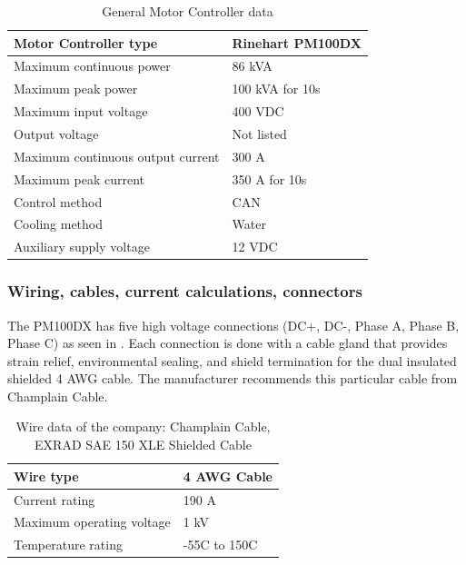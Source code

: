 \documentclass{article}
\begin{document}
\begin{table}[H]
	\centering
	\begin{tabular}{|l|l|}
	\hline
	Motor Controller type & Rinehart PM100DX \\ \hline
	Maximum continuous power & 86 kVA \\ \hline
	Maximum peak power & 100 kVA for 10s \\ \hline
	Maximum input voltage & 400 VDC \\ \hline
	Output voltage & Not listed \\ \hline
	Maximum continuous output current & 300 A \\ \hline
	Maximum peak current & 350 A for 10s \\ \hline
	Control method & CAN \\ \hline
	Cooling method & Water \\ \hline   
	Auxiliary supply voltage & 12 VDC \\ \hline
	\end{tabular}
	\caption{General Motor Controller data}
	\label{MC}
\end{table}

\subsubsection{Wiring, cables, current calculations, connectors}

The PM100DX has five high voltage connections (DC+, DC-, Phase A, Phase B, Phase C) as seen in . Each connection is done with a cable gland that provides strain relief, environmental sealing, and shield termination for the dual insulated shielded 4 AWG cable. The manufacturer recommends this particular cable from Champlain Cable. 

\begin{table}[H]
	\centering
	\begin{tabular}{|l|l|}
	\hline
	Wire type & 4 AWG Cable\\ \hline
	Current rating & 190 A \\ \hline
	Maximum operating voltage & 1 kV \\ \hline
	Temperature rating & -55\degree C to 150\degree C \\ \hline
	\end{tabular}
	\caption{Wire data of the company: Champlain Cable, EXRAD SAE 150 XLE Shielded Cable}
	\label{motor_controller_motortomcwire}
\end{table}
\end{document}

